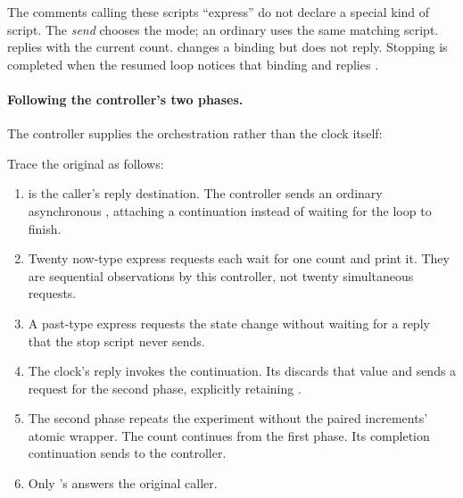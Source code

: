 
The comments calling these scripts ``express'' do not declare a special
kind of script. The \emph{send} chooses the mode; an ordinary 
uses the same matching script.  replies with the current count.
 changes a binding but does not reply. Stopping is completed
when the resumed loop notices that binding and replies .

\par\noindent\begin{minipage}{\linewidth}
\paragraph{Following the controller's two phases.}
The controller supplies the orchestration rather than the clock itself:
\par\vspace*{\medskipamount}

\end{minipage}\par

Trace the original \code{[test <== :start]} as follows:

\begin{enumerate}
  \item {} is the caller's reply destination. The controller sends
   an ordinary asynchronous , attaching a
  continuation instead of waiting for the loop to finish.
  \item Twenty now-type express  requests each wait for one
  count and print it. They are sequential observations by this controller,
  not twenty simultaneous requests.
  \item A past-type express  requests the state change without
  waiting for a reply that the stop script never sends.
  \item The clock's  reply invokes the continuation.
  Its \code{\_} discards that value and sends  a request for the
  second phase, explicitly retaining .
  \item The second phase repeats the experiment without the paired
  increments' atomic wrapper. The count continues from the first phase.
  Its completion continuation sends  to the controller.
  \item Only 's  answers the original caller.
\end{enumerate}

